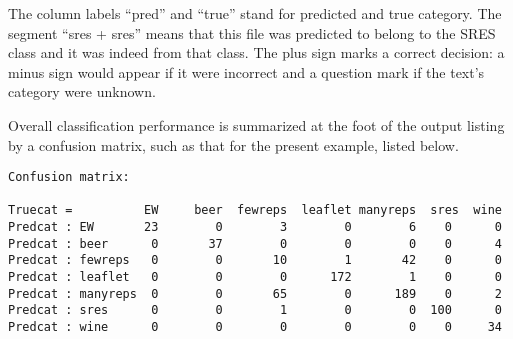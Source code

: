 \documentclass[output=paper]{langscibook}
\begin{document}
The column labels ``pred'' and ``true'' stand for predicted and true category. The segment ``sres + sres'' means that this file was predicted to belong to the SRES class and it was indeed from that class. The plus sign marks a correct decision: a minus sign would appear if it were incorrect and a question mark if the text's category were unknown.

Overall classification performance is summarized at the foot of the output listing by a confusion matrix, such as that for the present example, listed below.
\medskip

\begin{lstlisting}[basicstyle=\small\ttfamily]
Confusion matrix:

Truecat =          EW     beer  fewreps  leaflet manyreps  sres  wine
Predcat : EW       23        0        3        0        6    0      0
Predcat : beer      0       37        0        0        0    0      4
Predcat : fewreps   0        0       10        1       42    0      0
Predcat : leaflet   0        0        0      172        1    0      0
Predcat : manyreps  0        0       65        0      189    0      2
Predcat : sres      0        0        1        0        0  100      0
Predcat : wine      0        0        0        0        0    0     34
\end{lstlisting}


%
\end{document}
